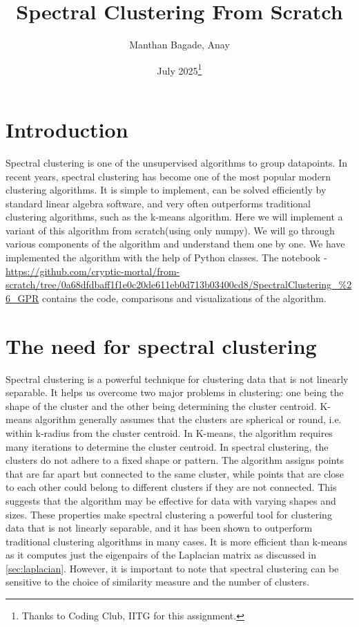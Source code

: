 \documentclass{article}
\title{Spectral Clustering From Scratch}
\author{Manthan Bagade, Anay}
\date{July 2025\thanks{Thanks to Coding Club, IITG for this assignment.}}
\begin{document}
\maketitle

\section{Introduction}
\label{sec:intro}
Spectral clustering is one of the unsupervised algorithms to group datapoints. In recent years, spectral clustering has become one of the most popular modern clustering
algorithms. It is simple to implement, can be solved efficiently by standard linear algebra software,
and very often outperforms traditional clustering algorithms, such as the k-means algorithm. \newline
Here we will implement a variant of this algorithm from scratch(using only numpy). We will go through various components of the algorithm and understand them one by one. We have implemented the algorithm with the help of Python classes. The notebook - \url{https://github.com/cryptic-mortal/from-scratch/tree/0a68dfdbaff1f1e0c20de611eb0d713b03400cd8/SpectralClustering_%26_GPR} contains the code, comparisons and visualizations of the algorithm.

\section{The need for spectral clustering}
\label{sec:need}
Spectral clustering is a powerful technique for clustering data that is not linearly separable. It helps us overcome two major problems in clustering: one being the shape of the cluster and the other being determining the cluster centroid. K-means algorithm generally assumes that the clusters are spherical or round, i.e. within k-radius from the cluster centroid. In K-means, the algorithm requires many iterations to determine the cluster centroid. \newline In spectral clustering, the clusters do not adhere to a fixed shape or pattern. The algorithm assigns points that are far apart but connected to the same cluster, while points that are close to each other could belong to different clusters if they are not connected. This suggests that the algorithm may be effective for data with varying shapes and sizes. These properties make spectral clustering a powerful tool for clustering data that is not linearly separable, and it has been shown to outperform traditional clustering algorithms in many cases. It is more efficient than k-means as it computes just the eigenpairs of the Laplacian matrix as discussed in \autoref{sec:laplacian}. However, it is important to note that spectral clustering can be sensitive to the choice of similarity measure and the number of clusters.
\end{document}
